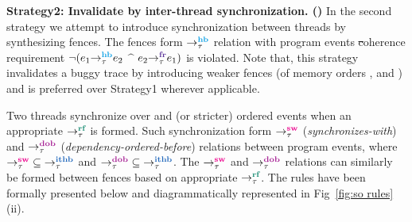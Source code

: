 \noindent
{\bf Strategy2: Invalidate by inter-thread synchronization.
(\wfence)}\newline
In the second strategy we attempt to introduce synchronization
between threads by synthesizing fences. The fences form
$\setHB$ relation with program events \st coherence
requirement
$\neg(\hb{\tau}{e_1}{e_2}$ $\^$ $\fr{\tau}{e_2}{e_1})$ is
violated.
%
Note that, this strategy invalidates a buggy trace by introducing 
weaker fences (of memory orders \rel, \acq and \acqrel) and 
is preferred over Strategy1 wherever applicable.

Two threads synchronize over \rel and \acq (or stricter) ordered
events when an appropriate $\setRF$ is formed. Such synchronization
form $\setSW$ ({\it synchronizes-with}) and $\setDOB$ 
({\it dependency-ordered-before}) relations between program events,
\cite{batty2011mathematizing}\cite{C11}
where $\setSW \subseteq \setITHB$ and $\setDOB \subseteq \setITHB$.
%
The $\setSW$ and $\setDOB$ relations can similarly be formed between
fences based on appropriate $\setRF$. 
The rules have been formally presented 
below and diagrammatically represented in Fig~\ref{fig:so rules}(ii).


